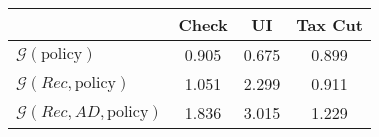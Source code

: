 \begin{tabular}{@{}lccc@{}} 
\toprule 
                          & Check      & UI    & Tax Cut    \\  \midrule 
$\mathcal{G}(\text{policy})$ & 0.905  & 0.675  & 0.899     \\ 
$\mathcal{G}(Rec,\text{policy})$ & 1.051  & 2.299  & 0.911     \\ 
$\mathcal{G}(Rec, AD,\text{policy})$ & 1.836  & 3.015  & 1.229     \\ 
\end{tabular}  
